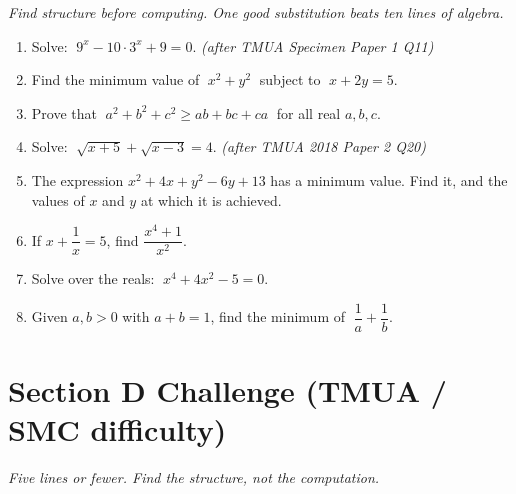 \documentclass[11pt,a4paper]{article}
\begin{document}
\noindent\textit{Find structure before computing. One good substitution beats ten lines of algebra.}

\begin{enumerate}

\item Solve: $\;9^x - 10\cdot 3^x + 9 = 0$. \textit{\small(after TMUA Specimen Paper 1 Q11)}

\item Find the minimum value of $\;x^2+y^2\;$ subject to $\;x+2y=5$.

\item Prove that $\;a^2+b^2+c^2 \geq ab+bc+ca\;$ for all real $a,b,c$.

\item Solve: $\;\sqrt{x+5}+\sqrt{x-3}=4$. \textit{\small(after TMUA 2018 Paper 2 Q20)}

\item The expression $x^2+4x+y^2-6y+13$ has a minimum value.
      Find it, and the values of $x$ and $y$ at which it is achieved.

\item If $x+\dfrac{1}{x}=5$, find $\dfrac{x^4+1}{x^2}$.

\item Solve over the reals: $\;x^4+4x^2-5=0$.

\item Given $a,b>0$ with $a+b=1$, find the minimum of $\;\dfrac{1}{a}+\dfrac{1}{b}$.

\end{enumerate}

\section*{Section D \quad Challenge \hfill{\normalfont\small(TMUA / SMC difficulty)}}

\noindent\textit{Five lines or fewer. Find the structure, not the computation.}
\end{document}
